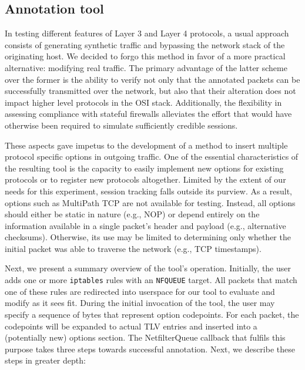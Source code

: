 \subsection{Annotation tool}

In testing different features of Layer 3 and Layer 4 protocols, a usual approach consists of generating synthetic traffic and bypassing the network stack of the originating host. We decided to forgo this method in favor of a more practical alternative: modifying real traffic. The primary advantage of the latter scheme over the former is the ability to verify not only that the annotated packets can be successfully transmitted over the network, but also that their alteration does not impact higher level protocols in the OSI stack. Additionally, the flexibility in assessing compliance with stateful firewalls alleviates the effort that would have otherwise been required to simulate sufficiently credible sessions.

These aspects gave impetus to the development of a method to insert multiple protocol specific options in outgoing traffic. One of the essential characteristics of the resulting tool is the capacity to easily implement new options for existing protocols or to register new protocols altogether. Limited by the extent of our needs for this experiment, session tracking falls outside its purview. As a result, options such as MultiPath TCP are not available for testing. Instead, all options should either be static in nature (e.g., NOP) or depend entirely on the information available in a single packet's header and payload (e.g., alternative checksums). Otherwise, its use may be limited to determining only whether the initial packet was able to traverse the network (e.g., TCP timestamps).

Next, we present a summary overview of the tool's operation. Initially, the user adds one or more \texttt{iptables} rules with an \texttt{NFQUEUE} target. All packets that match one of these rules are redirected into userspace for our tool to evaluate and modify as it sees fit. During the initial invocation of the tool, the user may specify a sequence of bytes that represent option codepoints. For each packet, the codepoints will be expanded to actual TLV entries and inserted into a (potentially new) options section. The NetfilterQueue callback that fulfils this purpose takes three steps towards successful annotation. Next, we describe these steps in greater depth:

